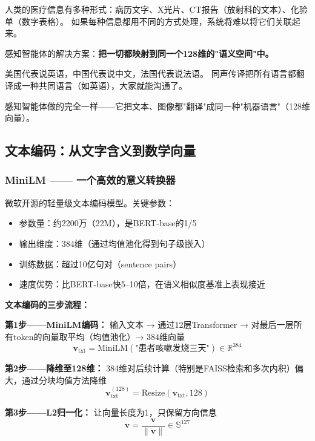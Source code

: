 \documentclass[11pt,a4paper]{ctexart}
\begin{document}
人类的医疗信息有多种形式：病历文字、X光片、CT报告（放射科的文本）、化验单（数字表格）。
如果每种信息都用不同的方式处理，系统将难以将它们关联起来。

感知智能体的解决方案：\textbf{把一切都映射到同一个128维的"语义空间"中。}

\begin{exambox}[类比：联合国同声传译]
美国代表说英语，中国代表说中文，法国代表说法语。
同声传译把所有语言都翻译成一种共同语言（如英语），大家就能沟通了。

感知智能体做的完全一样——它把文本、图像都"翻译"成同一种"机器语言"（128维向量）。
\end{exambox}

\subsection{文本编码：从文字含义到数学向量}

\subsubsection{MiniLM —— 一个高效的意义转换器}

\begin{defbox}
微软开源的轻量级文本编码模型。关键参数：
\begin{itemize}[nosep]
\item 参数量：约2200万（22M），是BERT-base的1/5
\item 输出维度：384维（通过均值池化得到句子级嵌入）
\item 训练数据：超过10亿句对（sentence pairs）
\item 速度优势：比BERT-base快5--10倍，在语义相似度基准上表现接近
\end{itemize}
\end{defbox}

\textbf{文本编码的三步流程：}

\textbf{第1步——MiniLM编码：} 输入文本 → 通过12层Transformer → 对最后一层所有token的向量取平均（均值池化）→ 384维向量
$$\mathbf{v}_{\text{txt}} = \text{MiniLM}(\text{"患者咳嗽发烧三天"}) \in \mathbb{R}^{384}$$

\textbf{第2步——降维至128维：} 384维对后续计算（特别是FAISS检索和多次内积）偏大，通过分块均值方法降维
$$\mathbf{v}_{\text{txt}}^{(128)} = \text{Resize}(\mathbf{v}_{\text{txt}}, 128)$$

\textbf{第3步——L2归一化：} 让向量长度为1，只保留方向信息
$$\mathbf{v} = \frac{\mathbf{v}}{\|\mathbf{v}\|} \in \mathbb{S}^{127}$$
\end{document}
